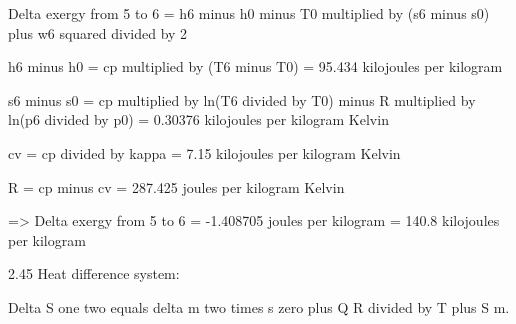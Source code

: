 Delta exergy from 5 to 6 = h6 minus h0 minus T0 multiplied by (s6 minus s0) plus w6 squared divided by 2  

h6 minus h0 = cp multiplied by (T6 minus T0) = 95.434 kilojoules per kilogram  

s6 minus s0 = cp multiplied by ln(T6 divided by T0) minus R multiplied by ln(p6 divided by p0) = 0.30376 kilojoules per kilogram Kelvin  

cv = cp divided by kappa = 7.15 kilojoules per kilogram Kelvin  

R = cp minus cv = 287.425 joules per kilogram Kelvin  

=> Delta exergy from 5 to 6 = -1.408705 joules per kilogram = 140.8 kilojoules per kilogram

2.45 Heat difference system:  

Delta S one two equals delta m two times s zero plus Q R divided by T plus S m.